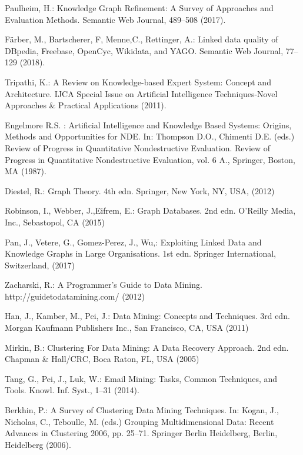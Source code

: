 \documentclass[runningheads]{llncs}
\begin{document}
\begin{thebibliography}{8}
Paulheim, H.: Knowledge Graph Refinement: A Survey of Approaches and Evaluation Methods. Semantic Web Journal, 489--508 (2017). 

F{\"a}rber, M., Bartscherer, F, Menne,C., Rettinger, A.: Linked data quality of DBpedia, Freebase, OpenCyc, Wikidata, and YAGO. Semantic Web Journal, 77--129 (2018). 

Tripathi, K.: A Review on Knowledge-based Expert System: Concept and Architecture. IJCA Special Issue on Artificial Intelligence Techniques-Novel Approaches \& Practical Applications (2011). 

Engelmore R.S.  : Artificial Intelligence and Knowledge Based Systems: Origins, Methods and Opportunities for NDE. In: Thompson D.O., Chimenti D.E. (eds.) Review of Progress in Quantitative Nondestructive Evaluation. Review of Progress in Quantitative Nondestructive Evaluation, vol. 6 A., 
Springer, Boston, MA (1987). 

Diestel, R.: Graph Theory. 4th edn. Springer, New York, NY, USA, (2012)

Robinson, I., Webber, J.,Eifrem, E.: Graph Databases. 2nd edn. O'Reilly Media, Inc., Sebastopol, CA (2015)

Pan, J., Vetere, G., Gomez-Perez, J., Wu,: Exploiting Linked Data and Knowledge Graphs in Large Organisations. 1st edn. Springer International, Switzerland, (2017)

Zacharski, R.: A Programmer's Guide to Data Mining. http://guidetodatamining.com/ (2012)

Han, J., Kamber, M., Pei, J.: Data Mining: Concepts and Techniques. 3rd edn. Morgan Kaufmann Publishers Inc.,
San Francisco, CA, USA (2011)

Mirkin, B.: Clustering For Data Mining: A Data Recovery Approach. 2nd edn. Chapman \& Hall/CRC,
Boca Raton, FL, USA (2005)

Tang, G., Pei, J., Luk, W.: Email Mining: Tasks, Common Techniques, and Tools. Knowl. Inf. Syst., 1--31 (2014). 

Berkhin, P.: A Survey of Clustering Data Mining Techniques. In: Kogan, J., Nicholas, C., Teboulle, M. (eds.) Grouping Multidimensional Data: Recent Advances in Clustering 2006, pp. 25--71.
Springer Berlin Heidelberg, Berlin, Heidelberg (2006). 


\end{thebibliography}
\end{document}
